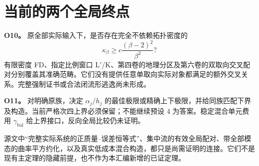 \documentclass[UTF8,11pt,openany,fontset=none]{ctexbook}
\theoremstyle{definition}
\theoremstyle{remark}
\begin{document}
\section{当前的两个全局终点}\label{v7-ux5f53ux524dux7684ux4e24ux4e2aux5168ux5c40ux7ec8ux70b9}

\textbf{O10。} 原全部实际输入下，是否存在完全不依赖拓扑密度的 \[
 \kappa_\beta\ge c\frac{(\beta-2)^2}{\beta^2}?
\] 有限密度 FD、指定比例窗口 L\({}'\)/K、第四卷的地理分区及第六卷的双取向交叉配对分别覆盖其准确范畴。它们没有提供任意单取向实际对象都满足的额外交叉关系。完整强制证书或合法闭流形逃逸尚未形成。

\textbf{O11。} 对明确原族，决定 \(\alpha_j/h_j\) 的最佳极限或精确上下极限，并给同族匹配下界及构造。当前严格次四上界必须保留；不能继续预设 \(4\) 为答案。稳定混合单元费用 \(\gamma_{\mathrm{bal}}\) 给上界接口，反向全局比较仍未证明。

源文中``完整实际系统的正质量--误差恒等式''、集中流的有效全局配对、带全部模态的曲率平方约化，以及真实低成本混合构造，都只是尚需证明的连接。它们不是现有主定理的隐藏前提，也不作为本汇编新增的已证定理。


\backmatter
\renewcommand{\bibname}{来源与参考文献}
\end{document}
